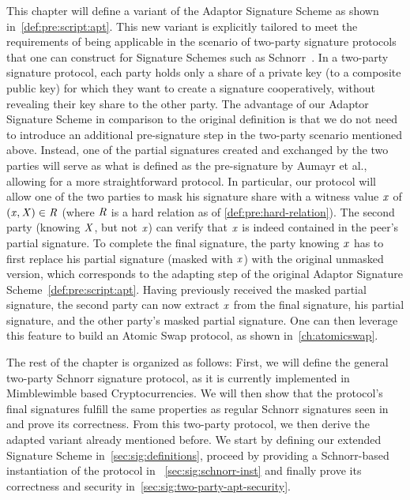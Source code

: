 This chapter will define a variant of the Adaptor Signature Scheme as shown in~\cref{def:pre:script:apt}.
This new variant is explicitly tailored to meet the requirements of being applicable in the scenario of two-party signature protocols that one can construct for Signature Schemes such as Schnorr~\cite{maxwell2019simple}.
In a two-party signature protocol, each party holds only a share of a private key (to a composite public key) for which they want to create a signature cooperatively, without revealing their key share to the other party.
The advantage of our Adaptor Signature Scheme in comparison to the original definition is that we do not need to introduce an additional pre-signature step in the two-party scenario mentioned above.
Instead, one of the partial signatures created and exchanged by the two parties will serve as what is defined as the pre-signature by Aumayr et al., allowing for a more straightforward protocol.
In particular, our protocol will allow one of the two parties to mask his signature share with a witness value $\mathit{x}$ of $(\mathit{x}, \mathit{X}) \in \mathit{R}$ (where $\mathit{R}$ is a hard relation as of \cref{def:pre:hard-relation}).
The second party (knowing $\mathit{X}$, but not $\mathit{x}$) can verify that $\mathit{x}$ is indeed contained in the peer's partial signature.
To complete the final signature, the party knowing $\mathit{x}$ has to first replace his partial signature (masked with $\mathit{x}$) with the original unmasked version, which corresponds to the adapting step of the original Adaptor Signature Scheme~\cref{def:pre:script:apt}.
Having previously received the masked partial signature, the second party can now extract $\mathit{x}$ from the final signature, his partial signature, and the other party's masked partial signature.
One can then leverage this feature to build an Atomic Swap protocol, as shown in~\cref{ch:atomicswap}.

The rest of the chapter is organized as follows:
First, we will define the general two-party Schnorr signature protocol, as it is currently implemented in Mimblewimble based Cryptocurrencies.
We will then show that the protocol's final signatures fulfill the same properties as regular Schnorr signatures seen in~\cite{schnorr1989efficient} and prove its correctness.
From this two-party protocol, we then derive the adapted variant already mentioned before.
We start by defining our extended Signature Scheme in~\cref{sec:sig:definitions}, proceed by providing a Schnorr-based instantiation of the protocol in ~\cref{sec:sig:schnorr-inst} and finally prove its correctness and security in~\cref{sec:sig:two-party-apt-security}.

